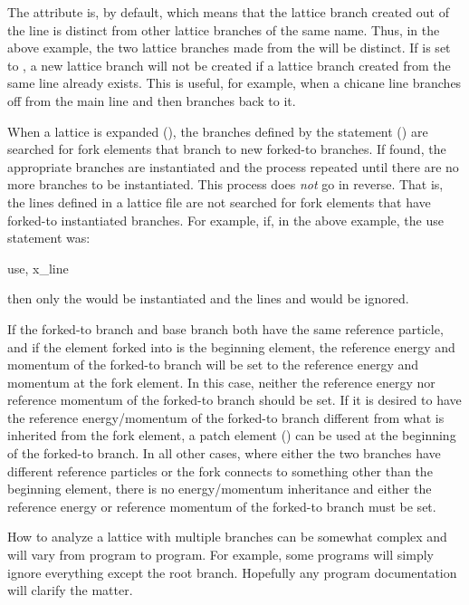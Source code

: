 The  attribute is, by default,  which means that the lattice branch created
out of the  line is distinct from other lattice branches of the same name. Thus, in the
above example, the two lattice branches made from the  will be distinct. If
 is set to , a new lattice branch will not be created if a lattice branch
created from the same line already exists. This is useful, for example, when a chicane line branches
off from the main line and then branches back to it.

When a lattice is expanded (), the branches defined by the  statement
() are searched for fork elements that branch to new forked-to branches. If found, the
appropriate branches are instantiated and the process repeated until there are no more branches to
be instantiated. This process does {\em not} go in reverse. That is, the lines defined in a lattice
file are not searched for fork elements that have forked-to instantiated branches. For example, if, in
the above example, the use statement was:
\begin{example}
  use, x_line
\end{example}
then only the  would be instantiated and the lines  and  would be
ignored.

If the forked-to branch and base branch both have the same reference particle, and if the element
forked into is the beginning element, the reference energy and momentum of the forked-to branch will be
set to the reference energy and momentum at the fork element. In this case, neither the reference
energy nor reference momentum of the forked-to branch should be set. If it is desired to have the
reference energy/momentum of the forked-to branch different from what is inherited from the fork
element, a patch element () can be used at the beginning of the forked-to branch. In all
other cases, where either the two branches have different reference particles or the fork connects
to something other than the beginning element, there is no energy/momentum inheritance and either
the reference energy or reference momentum of the forked-to branch must be set.

How to analyze a lattice with multiple branches can be somewhat complex and will vary from program
to program. For example, some programs will simply ignore everything except the root branch. Hopefully
any program documentation will clarify the matter.

